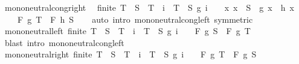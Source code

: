 \begin{isabellebody}
\isamarkupfalse%
%
\endisatagproof
{\isafoldproof}%
%
\isadelimproof
\isanewline
%
\endisadelimproof
\isanewline
{}\isamarkupfalse%
\ mono{\isacharunderscore}{\kern0pt}neutral{\isacharunderscore}{\kern0pt}cong{\isacharunderscore}{\kern0pt}right{\isacharcolon}{\kern0pt}\isanewline
\ \ {\isachardoublequoteopen}finite\ T\ {\isasymLongrightarrow}\ S\ {\isasymsubseteq}\ T\ {\isasymLongrightarrow}\ {\isasymforall}i\ {\isasymin}\ T\ {\isacharminus}{\kern0pt}\ S{\isachardot}{\kern0pt}\ g\ i\ {\isacharequal}{\kern0pt}\ \ {\isasymLongrightarrow}\ {\isacharparenleft}{\kern0pt}{\isasymAnd}x{\isachardot}{\kern0pt}\ x\ {\isasymin}\ S\ {\isasymLongrightarrow}\ g\ x\ {\isacharequal}{\kern0pt}\ h\ x{\isacharparenright}{\kern0pt}\ {\isasymLongrightarrow}\isanewline
\ \ \ \ F\ g\ T\ {\isacharequal}{\kern0pt}\ F\ h\ S{\isachardoublequoteclose}\isanewline
%
\isadelimproof
\ \ %
\endisadelimproof
%
\isatagproof
{}\isamarkupfalse%
\ {\isacharparenleft}{\kern0pt}auto\ intro{\isacharbang}{\kern0pt}{\isacharcolon}{\kern0pt}\ mono{\isacharunderscore}{\kern0pt}neutral{\isacharunderscore}{\kern0pt}cong{\isacharunderscore}{\kern0pt}left\ {\isacharbrackleft}{\kern0pt}symmetric{\isacharbrackright}{\kern0pt}{\isacharparenright}{\kern0pt}%
\endisatagproof
{\isafoldproof}%
%
\isadelimproof
\isanewline
%
\endisadelimproof
\isanewline
{}\isamarkupfalse%
\ mono{\isacharunderscore}{\kern0pt}neutral{\isacharunderscore}{\kern0pt}left{\isacharcolon}{\kern0pt}\ {\isachardoublequoteopen}finite\ T\ {\isasymLongrightarrow}\ S\ {\isasymsubseteq}\ T\ {\isasymLongrightarrow}\ {\isasymforall}i\ {\isasymin}\ T\ {\isacharminus}{\kern0pt}\ S{\isachardot}{\kern0pt}\ g\ i\ {\isacharequal}{\kern0pt}\ \ {\isasymLongrightarrow}\ F\ g\ S\ {\isacharequal}{\kern0pt}\ F\ g\ T{\isachardoublequoteclose}\isanewline
%
\isadelimproof
\ \ %
\endisadelimproof
%
\isatagproof
{}\isamarkupfalse%
\ {\isacharparenleft}{\kern0pt}blast\ intro{\isacharcolon}{\kern0pt}\ mono{\isacharunderscore}{\kern0pt}neutral{\isacharunderscore}{\kern0pt}cong{\isacharunderscore}{\kern0pt}left{\isacharparenright}{\kern0pt}%
\endisatagproof
{\isafoldproof}%
%
\isadelimproof
\isanewline
%
\endisadelimproof
\isanewline
{}\isamarkupfalse%
\ mono{\isacharunderscore}{\kern0pt}neutral{\isacharunderscore}{\kern0pt}right{\isacharcolon}{\kern0pt}\ {\isachardoublequoteopen}finite\ T\ {\isasymLongrightarrow}\ S\ {\isasymsubseteq}\ T\ {\isasymLongrightarrow}\ {\isasymforall}i\ {\isasymin}\ T\ {\isacharminus}{\kern0pt}\ S{\isachardot}{\kern0pt}\ g\ i\ {\isacharequal}{\kern0pt}\ \ {\isasymLongrightarrow}\ F\ g\ T\ {\isacharequal}{\kern0pt}\ F\ g\ S{\isachardoublequoteclose}\isanewline

\end{isabellebody}
